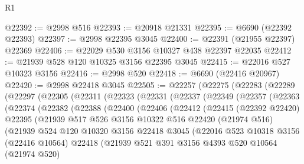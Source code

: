 \begin{lexlean}{R1}
\begin{coremodule}
@22392 := @2998 @516
@22393 := @20918 @21331
@22395 := @6690 (@22392 @22393)
@22397 := @2998 @22395 @3045
@22400 := @22391 (@21955 @22397) @22369
@22406 := @22029 @530 @3156 @10327 @438 @22397 @22035
@22412 := @21939 @528 @120 @10325 @3156 @22395 @3045
@22415 := @22016 @527 @10323 @3156
@22416 := @2998 @520
@22418 := @6690 (@22416 @20967)
@22420 := @2998 @22418 @3045
@22505 := @22257
    (@22275
      (@22283
        (@22289
          (@22297
            (@22305
              (@22311
                (@22323
                  (@22331
                    (@22337
                      (@22349
                        (@22357
                          (@22363
                            (@22374
                              (@22382
                                (@22388
                                  (@22400
                                    (@22406
                                      (@22412
                                        (@22415
                                          (@22392 @22420)
                                          @22395
                                          (@21939
                                            @517
                                            @526
                                            @3156
                                            @10322
                                            @516
                                            @22420
                                            (@21974 @516)
                                            (@21939
                                              @524
                                              @120
                                              @10320
                                              @3156
                                              @22418
                                              @3045
                                              (@22016
                                                @523
                                                @10318
                                                @3156
                                                (@22416 @10564)
                                                @22418
                                                (@21939
                                                  @521
                                                  @391
                                                  @3156
                                                  @4393
                                                  @520
                                                  @10564
                                                  (@21974 @520)

\end{coremodule}
\end{lexlean}
